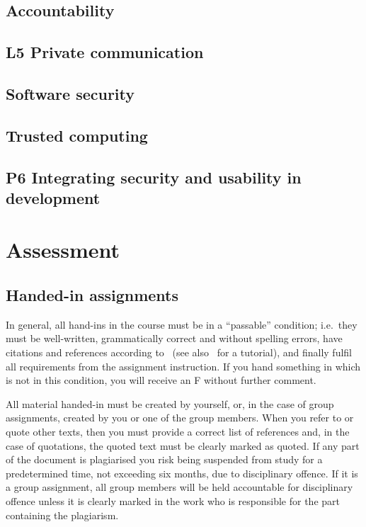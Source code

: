 \subsection{Accountability}


\subsection{L5 Private communication}


\subsection{Software security}


\subsection{Trusted computing}


\subsection{P6 Integrating security and usability in development}



\section{Assessment}%
\label{Assessment}


\subsection{Handed-in assignments}

In general, all hand-ins in the course must be in a \enquote{passable} 
condition; i.e.~they must be well-written, grammatically correct and without 
spelling errors, have citations and references according to~\cite{IEEEcitation} 
(see also~\cite{PurdueCitation} for a tutorial), and finally fulfil all 
requirements from the assignment instruction.
If you hand something in which is not in this condition, you will receive an 
F without further comment.

All material handed-in must be created by yourself, or, in the case of group 
assignments, created by you or one of the group members.
When you refer to or quote other texts, then you must provide a correct list of 
references and, in the case of quotations, the quoted text must be clearly 
marked as quoted.
If any part of the document is plagiarised you risk being suspended from study 
for a predetermined time, not exceeding six months, due to disciplinary 
offence.
If it is a group assignment, all group members will be held accountable for 
disciplinary offence unless it is clearly marked in the work who is responsible 
for the part containing the plagiarism.

